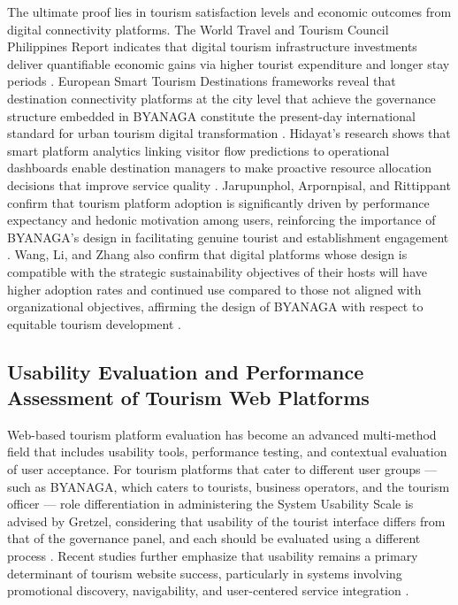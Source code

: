 \documentclass{research}
\begin{document}
The ultimate proof lies in tourism satisfaction levels and economic outcomes from digital connectivity platforms. The World Travel and Tourism Council Philippines Report indicates that digital tourism infrastructure investments deliver quantifiable economic gains via higher tourist expenditure and longer stay periods \cite{wttc2025}. European Smart Tourism Destinations frameworks reveal that destination connectivity platforms at the city level that achieve the governance structure embedded in BYANAGA constitute the present-day international standard for urban tourism digital transformation \cite{european2022}. Hidayat's research shows that smart platform analytics linking visitor flow predictions to operational dashboards enable destination managers to make proactive resource allocation decisions that improve service quality \cite{hidayat2023b}. Jarupunphol, Arpornpisal, and Rittippant confirm that tourism platform adoption is significantly driven by performance expectancy and hedonic motivation among users, reinforcing the importance of BYANAGA's design in facilitating genuine tourist and establishment engagement \cite{jarupunphol2025}. Wang, Li, and Zhang also confirm that digital platforms whose design is compatible with the strategic sustainability objectives of their hosts will have higher adoption rates and continued use compared to those not aligned with organizational objectives, affirming the design of BYANAGA with respect to equitable tourism development \cite{wang2024b}.

\subsection{Usability Evaluation and Performance Assessment of Tourism Web Platforms}

Web-based tourism platform evaluation has become an advanced multi-method field that includes usability tools, performance testing, and contextual evaluation of user acceptance. For tourism platforms that cater to different user groups — such as BYANAGA, which caters to tourists, business operators, and the tourism officer — role differentiation in administering the System Usability Scale is advised by Gretzel, considering that usability of the tourist interface differs from that of the governance panel, and each should be evaluated using a different process \cite{gretzel2023}. Recent studies further emphasize that usability remains a primary determinant of tourism website success, particularly in systems involving promotional discovery, navigability, and user-centered service integration \cite{tsegaye2021,atiya2021}.
 
\end{document}
